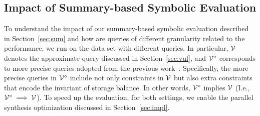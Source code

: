 \subsection{Impact of Summary-based Symbolic Evaluation}\label{sec:expr}

To understand the impact of our summary-based symbolic evaluation described 
in Section~\ref{sec:sum} and how are queries of different granularity related to the performance, we run \toolname on the \etherscan data set with different queries. In particular, $\mathcal{V}$ denotes the approximate query discussed in Section~\ref{sec:vul}, and $\mathcal{V}^{\diamond}$ corresponds to more precise queries adopted from the previous work~\cite{Hirai17}. Specifically, the more precise queries in $\mathcal{V}^{\diamond}$ include not only constraints in $\mathcal{V}$ but also extra constraints that encode the invariant of storage balance. In other words, $\mathcal{V}^{\diamond}$ implies $\mathcal{V}$ (I.e., $\mathcal{V}^{\diamond} \implies \mathcal{V}$).
To speed up the evaluation, for both settings, we enable the
parallel synthesis optimization discussed in Section~\ref{sec:impl}. 
%

